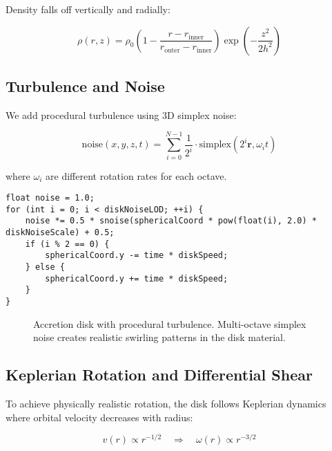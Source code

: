 \documentclass[12pt,a4paper]{article}
\theoremstyle{definition}
\theoremstyle{remark}
\begin{document}
Density falls off vertically and radially:

\begin{equation}
    \rho(r, z) = \rho_0 \left(1 - \frac{r - r_{\text{inner}}}{r_{\text{outer}} - r_{\text{inner}}}\right) \exp\left(-\frac{z^2}{2h^2}\right)
\end{equation}

\subsection{Turbulence and Noise}

We add procedural turbulence using 3D simplex noise:

\begin{equation}
    \text{noise}(x, y, z, t) = \sum_{i=0}^{N-1} \frac{1}{2^i} \cdot \text{simplex}(2^i \mathbf{r}, \omega_i t)
\end{equation}

where $\omega_i$ are different rotation rates for each octave.

\begin{lstlisting}[style=metalstyle, caption=Multi-octave noise for turbulence]
float noise = 1.0;
for (int i = 0; i < diskNoiseLOD; ++i) {
    noise *= 0.5 * snoise(sphericalCoord * pow(float(i), 2.0) * diskNoiseScale) + 0.5;
    if (i % 2 == 0) {
        sphericalCoord.y -= time * diskSpeed;
    } else {
        sphericalCoord.y += time * diskSpeed;
    }
}
\end{lstlisting}

\begin{figure}[H]
    \centering
    \caption{Accretion disk with procedural turbulence. Multi-octave simplex noise creates realistic swirling patterns in the disk material.}
    \label{fig:disk_turbulence}
\end{figure}

\subsection{Keplerian Rotation and Differential Shear}

To achieve physically realistic rotation, the disk follows Keplerian dynamics where orbital velocity decreases with radius:

\begin{equation}
    v(r) \propto r^{-1/2} \quad \Rightarrow \quad \omega(r) \propto r^{-3/2}
\end{equation}
\end{document}
